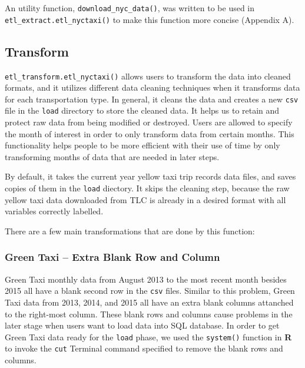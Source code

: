 \documentclass[12pt,twoside]{reedthesis}
\newenvironment{Shaded}{\begin{snugshade}}{\end{snugshade}}
\newcommand{\KeywordTok}[1]{\textcolor[rgb]{0.13,0.29,0.53}{\textbf{#1}}}
\newcommand{\DataTypeTok}[1]{\textcolor[rgb]{0.13,0.29,0.53}{#1}}
\newcommand{\DecValTok}[1]{\textcolor[rgb]{0.00,0.00,0.81}{#1}}
\newcommand{\StringTok}[1]{\textcolor[rgb]{0.31,0.60,0.02}{#1}}
\newcommand{\OperatorTok}[1]{\textcolor[rgb]{0.81,0.36,0.00}{\textbf{#1}}}
\newcommand{\NormalTok}[1]{#1}
\theoremstyle{definition}
\theoremstyle{definition}
\theoremstyle{definition}
\theoremstyle{remark}
\begin{document}
An utility function, \texttt{download\_nyc\_data()}, was written to be
used in \texttt{etl\_extract.etl\_nyctaxi()} to make this function more
concise (Appendix A).

\subsection{Transform}\label{transform}

\texttt{etl\_transform.etl\_nyctaxi()} allows users to transform the
data into cleaned formats, and it utilizes different data cleaning
techniques when it transforms data for each transportation type. In
general, it cleans the data and creates a new \texttt{csv} file in the
\texttt{load} directory to store the cleaned data. It helps us to retain
and protect raw data from being modified or destroyed. Users are allowed
to specify the month of interest in order to only transform data from
certain months. This functionality helps people to be more efficient
with their use of time by only transforming months of data that are
needed in later steps.

By default, it takes the current year yellow taxi trip records data
files, and saves copies of them in the \texttt{load} diectory. It skips
the cleaning step, because the raw yellow taxi data downloaded from TLC
is already in a desired format with all variables correctly labelled.
\begin{Shaded}
\end{Shaded}
There are a few main transformations that are done by this function:

\subsubsection{Green Taxi -- Extra Blank Row and
Column}\label{green-taxi-extra-blank-row-and-column}

Green Taxi monthly data from August 2013 to the most recent month
besides 2015 all have a blank second row in the \texttt{csv} files.
Similar to this problem, Green Taxi data from 2013, 2014, and 2015 all
have an extra blank columns attanched to the right-most column. These
blank rows and columns cause problems in the later stage when users want
to load data into SQL database. In order to get Green Taxi data ready
for the \texttt{load} phase, we used the \texttt{system()} function in
\textbf{R} to invoke the \texttt{cut} Terminal command specified to
remove the blank rows and columns.
\end{document}
